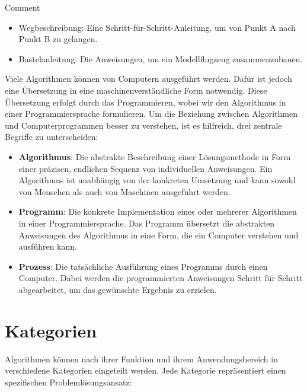 \documentclass[
  letterpaper,
  DIV=11]{scrreprt}
\begin{document}
Comment

\begin{itemize}
\item
  Wegbeschreibung: Eine Schritt-für-Schritt-Anleitung, um von Punkt A
  nach Punkt B zu gelangen.
\item
  Bastelanleitung: Die Anweisungen, um ein Modellflugzeug
  zusammenzubauen.
\end{itemize}

Viele Algorithmen können von Computern ausgeführt werden. Dafür ist
jedoch eine Übersetzung in eine maschinenverständliche Form notwendig.
Diese Übersetzung erfolgt durch das Programmieren, wobei wir den
Algorithmus in einer Programmiersprache formulieren. Um die Beziehung
zwischen Algorithmen und Computerprogrammen besser zu verstehen, ist es
hilfreich, drei zentrale Begriffe zu unterscheiden:

\begin{itemize}
\item
  \textbf{Algorithmus}: Die abstrakte Beschreibung einer Lösungsmethode
  in Form einer präzisen, endlichen Sequenz von individuellen
  Anweisungen. Ein Algorithmus ist unabhängig von der konkreten
  Umsetzung und kann sowohl von Menschen als auch von Maschinen
  ausgeführt werden.
\item
  \textbf{Programm}: Die konkrete Implementation eines oder mehrerer
  Algorithmen in einer Programmiersprache. Das Programm übersetzt die
  abstrakten Anweisungen des Algorithmus in eine Form, die ein Computer
  verstehen und ausführen kann.
\item
  \textbf{Prozess}: Die tatsächliche Ausführung eines Programms durch
  einen Computer. Dabei werden die programmierten Anweisungen Schritt
  für Schritt abgearbeitet, um das gewünschte Ergebnis zu erzielen.
\end{itemize}

\section{Kategorien}\label{kategorien}

Algorithmen können nach ihrer Funktion und ihrem Anwendungsbereich in
verschiedene Kategorien eingeteilt werden. Jede Kategorie repräsentiert
einen spezifischen Problemlösungsansatz:
\end{document}
